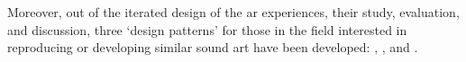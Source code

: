 \begin{SingleSpace}
    Moreover, out of the iterated design of the \ac{ar} experiences, their study, evaluation, and discussion, three `design patterns' for those in the field interested in reproducing or developing similar sound \ac{art} have been developed: \textit{\hyperref[sec: discussion-patterns-experience]{}}, \textit{\hyperref[sec: discussion-patterns-instrument]{}}, and \textit{\hyperref[sec: discussion-patterns-environment]{}}.   
\end{SingleSpace}
\acresetall